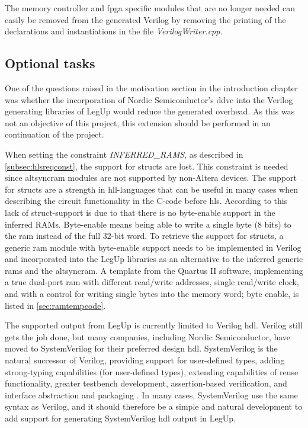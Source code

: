 The memory controller and \gls{fpga} specific modules that are no longer needed can easily be removed from the generated Verilog by removing the printing of the declarations and instantiations in the file \textit{VerilogWriter.cpp}.

\subsection{Optional tasks}

One of the questions raised in the motivation section in the introduction chapter was whether the incorporation of Nordic Semiconductor's \gls{ddvc} into the Verilog generating libraries of LegUp would reduce the generated overhead. As this was not an objective of this project, this extension should be performed in an continuation of the project.

When setting the constraint \textit{INFERRED\_RAMS}, as described in \cref{subsec:hlsreqconst}, the support for structs are lost. This constraint is needed since altsyncram modules are not supported by non-Altera devices. The support for structs are a strength in \gls{hll}-languages that can be useful in many cases when describing the circuit functionality in the C-code before \gls{hls}. According to \cite{legupconst} this lack of struct-support is due to that there is no byte-enable support in the inferred RAMs. Byte-enable means being able to write a single byte (8 bits) to the \gls{ram} instead of the full 32-bit word. To retrieve the support for structs, a generic \gls{ram} module with byte-enable support needs to be implemented in Verilog and incorporated into the LegUp libraries as an alternative to the inferred generic \gls{ram}s and the altsyncram. A template from the Quartus II software, implementing a true dual-port \gls{ram} with different read/write addresses, single read/write clock, and with a control for writing single bytes into the memory word; byte enable, is listed in \cref{sec:ramtempcode}.

The supported output from LegUp is currently limited to Verilog \gls{hdl}. Verilog still gets the job done, but many companies, including Nordic Semiconductor, have moved to SystemVerilog for their preferred design \gls{hdl}. SystemVerilog is the natural successor of Verilog, providing support for user-defined types, adding strong-typing capabilities (for user-defined types), extending capabilities of reuse functionality, greater testbench development, assertion-based verification, and interface abstraction and packaging \cite{bailey2003comparison}. In many cases, SystemVerilog use the same syntax as Verilog, and it should therefore be a simple and natural development to add support for generating SystemVerilog \gls{hdl} output in LegUp.

